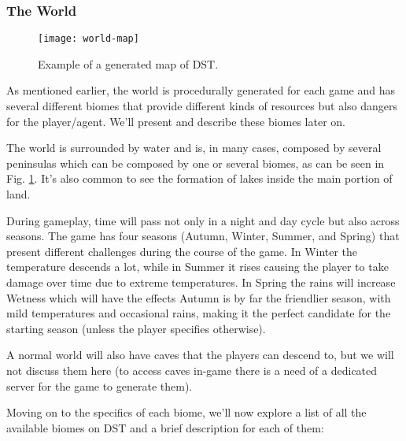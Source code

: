 \subsubsection{The World}

\begin{figure}
  \centering
    \texttt{[image: world-map]}
  \caption{Example of a generated map of \ac{DST}.}
  \label{fig:world-map}
\end{figure}
As mentioned earlier, the world is procedurally generated for each game and has several different biomes that provide different kinds of resources but also dangers for the player/agent. 
We'll present and describe these biomes later on.

The world is surrounded by water and is, in many cases, composed by several peninsulas which can be composed by one or several biomes, as can be seen in Fig. \ref{fig:world-map}.
It's also common to see the formation of lakes inside the main portion of land.

During gameplay, time will pass not only in a night and day cycle but also across seasons.
The game has four seasons (Autumn, Winter, Summer, and Spring) that present different challenges during the course of the game.
In Winter the temperature descends a lot, while in Summer it rises causing the player to take damage over time due to extreme temperatures.
In Spring the rains will increase Wetness which will have the effects 
Autumn is by far the friendlier season, with mild temperatures and occasional rains, making it the perfect candidate for the starting season (unless the player specifies otherwise).

A normal world will also have caves that the players can descend to, but we will not discuss them here (to access caves in-game there is a need of a dedicated server for the game to generate them).

Moving on to the specifics of each biome, we'll now explore a list of all the available biomes on \ac{DST} and a brief description for each of them:

